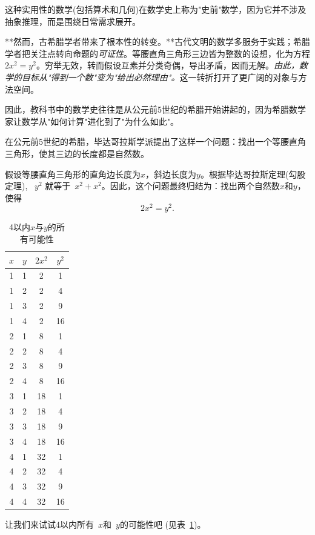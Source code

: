 这种实用性的数学(包括算术和几何)在数学史上称为"史前"数学，因为它并不涉及抽象推理，而是围绕日常需求展开。

**然而，古希腊学者带来了根本性的转变。**古代文明的数学多服务于实践；希腊学者把关注点转向命题的\emph{可证性}。等腰直角三角形三边皆为整数的设想，化为方程 $2x^2=y^2$。穷举无效，转而假设互素并分类奇偶，导出矛盾，因而无解。\emph{由此，数学的目标从"得到一个数"变为"给出必然理由"。}这一转折打开了更广阔的对象与方法空间。

因此，教科书中的数学史往往是从公元前5世纪的希腊开始讲起的，因为希腊数学家让数学从"如何计算"进化到了"为什么如此"。

在公元前5世纪的希腊，毕达哥拉斯学派提出了这样一个问题：找出一个等腰直角三角形，使其三边的长度都是自然数。


假设等腰直角三角形的直角边长度为$x$，斜边长度为$y$。根据毕达哥拉斯定理(勾股定理), ~$y^2$ 就等于~$x^2+x^2$。因此，这个问题最终归结为：找出两个自然数$x$和$y$，使得
\begin{equation}\label{eqn}
2x^2=y^2.
\end{equation}

\begin{table}[htbp]
\centering
\caption{4以内$x$与$y$的所有可能性}
\begin{tabular}{|c|c|c|c|}
\hline
$x$ & $y$ & $2x^2$ & $y^2$ \\
\hline
1 & 1 & 2 & 1 \\
\hline
1 & 2 & 2 & 4 \\
\hline
1 & 3 & 2 & 9 \\
\hline
1 & 4 & 2 & 16 \\
\hline
2 & 1 & 8 & 1 \\
\hline
2 & 2 & 8 & 4 \\
\hline
2 & 3 & 8 & 9 \\
\hline
2 & 4 & 8 & 16 \\
\hline
3 & 1 & 18 & 1 \\
\hline
3 & 2 & 18 & 4 \\
\hline
3 & 3 & 18 & 9 \\
\hline
3 & 4 & 18 & 16 \\
\hline
4 & 1 & 32 & 1 \\
\hline
4 & 2 & 32 & 4 \\
\hline
4 & 3 & 32 & 9 \\
\hline
4 & 4 & 32 & 16 \\
\hline
\end{tabular}
\label{tab:example}
\end{table}
让我们来试试4以内所有~$x$和~$y$的可能性吧 (见表~\ref{tab:example})。

